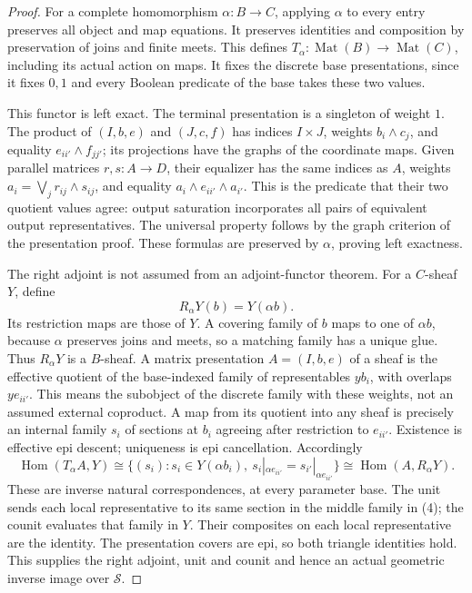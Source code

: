 \begin{proof}
For a complete homomorphism \(\alpha:B\to C\), applying
\(\alpha\) to every entry preserves all object and map equations.
It preserves identities and composition by preservation of joins and
finite meets. This defines \(T_\alpha:\operatorname{Mat}(B)\to
\operatorname{Mat}(C)\), including its actual action on maps.
It fixes the discrete base presentations, since it fixes \(0,1\)
and every Boolean predicate of the base takes these two values.

This functor is left exact. The terminal presentation is a singleton
of weight \(1\). The product of \((I,b,e)\) and \((J,c,f)\)
has indices \(I\times J\), weights \(b_i\wedge c_j\), and
equality \(e_{ii'}\wedge f_{jj'}\); its projections have the
graphs of the coordinate maps. Given parallel matrices \(r,s:A\to D\),
their equalizer has the same indices as \(A\), weights
\(a_i=\bigvee_j r_{ij}\wedge s_{ij}\), and equality
\(a_i\wedge e_{ii'}\wedge a_{i'}\). This is the predicate
that their two quotient values agree: output saturation incorporates
all pairs of equivalent output representatives. The universal property
follows by the graph criterion of the presentation proof. These formulas
are preserved by \(\alpha\), proving left exactness.

The right adjoint is not assumed from an adjoint-functor theorem.
For a \(C\)-sheaf \(Y\), define
\[
             R_\alpha Y(b)=Y(\alpha b).
\]
Its restriction maps are those of \(Y\). A covering family of
\(b\) maps to one of \(\alpha b\), because \(\alpha\)
preserves joins and meets, so a matching family has a unique glue.
Thus \(R_\alpha Y\) is a \(B\)-sheaf. A matrix presentation
\(A=(I,b,e)\) of a sheaf is the effective quotient of the
base-indexed family of representables \(y b_i\), with overlaps
\(y e_{ii'}\). This means the subobject of the discrete family
with these weights, not an assumed external coproduct. A map from
its quotient into any sheaf is precisely an internal family
\(s_i\) of sections at \(b_i\) agreeing after restriction to
\(e_{ii'}\). Existence is effective epi descent; uniqueness is
epi cancellation. Accordingly
\[
 \operatorname{Hom}(T_\alpha A,Y)
 \cong\{(s_i):s_i\in Y(\alpha b_i),\ s_i|_{\alpha e_{ii'}}
                           =s_{i'}|_{\alpha e_{ii'}}\}
 \cong\operatorname{Hom}(A,R_\alpha Y).                 \tag{4}
\]
These are inverse natural correspondences, at every parameter base.
The unit sends each local representative to its same section in the
middle family in (4); the counit evaluates that family in \(Y\).
Their composites on each local representative are the identity.
The presentation covers are epi, so both triangle identities hold.
This supplies the right adjoint, unit and counit and hence an actual
geometric inverse image over \(\mathcal S\).


\end{proof}
